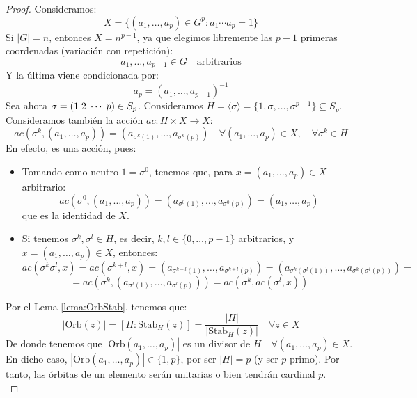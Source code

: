 \documentclass[12pt]{article}
\newcommand{\Stab}{\text{Stab}}
\newcommand{\Orb}{\text{Orb}}
\begin{document}
\begin{ejercicio}[2 puntos]
        \begin{proof}
            Consideramos:
            $$X = \{(a_1, \ldots, a_p) \in G^{p} : a_1 \cdots a_p = 1\}$$
            Si $|G| = n$, entonces $X = n^{p-1}$, ya que elegimos libremente las $p-1$ primeras coordenadas (variación con repetición):
            $$a_1, \ldots, a_{p-1} \in G \quad \text{arbitrarios}$$
            Y la última viene condicionada por:
            $$a_p = (a_1, \ldots, a_{p-1})^{-1}$$
            Sea ahora $\sigma = (1 \hspace{0.1cm} 2 \hspace{0.1cm} \cdots \hspace{0.1cm} p) \in S_p$. Consideramos $H = \langle \sigma \rangle = \{1, \sigma, \ldots, \sigma^{p-1}\} \subseteq S_p$. Consideramos también la acción $ac : H \times X \to X$:
            $$ac(\sigma^{k}, (a_1, \ldots, a_p)) = (a_{\sigma^{k}(1)}, \ldots, a_{\sigma^{k}(p)}) \quad \forall(a_1,\ldots,a_p) \in X, \quad \forall \sigma^{k} \in H$$
            En efecto, es una acción, pues:
            \begin{itemize}
                \item Tomando como neutro $1 = \sigma^{0}$, tenemos que, para $x = (a_1, \ldots, a_p) \in X$ arbitrario: $$ac(\sigma^{0}, (a_1, \ldots, a_p)) = (a_{\sigma^{0}(1)}, \ldots, a_{\sigma^{0}(p)}) = (a_1, \ldots, a_p)$$ que es la identidad de $X$.
                \item Si tenemos $\sigma^{k}, \sigma^{l} \in H$, es decir, $k,l \in \{0, \ldots, p-1\}$ arbitrarios, y $x=(a_1, \ldots, a_p) \in X$, entonces:
                $$ac(\sigma^{k} \sigma^{l}, x) = ac(\sigma^{k+l}, x) = (a_{\sigma^{k+l}(1)}, \ldots, a_{\sigma^{k+l}(p)}) = (a_{\sigma^{k}(\sigma^{l}(1))}, \ldots, a_{\sigma^{k}(\sigma^{l}(p))}) = $$
                $$= ac(\sigma^{k}, (a_{\sigma^{l}(1)}, \ldots, a_{\sigma^{l}(p)})) = ac(\sigma^{k}, ac(\sigma^{l}, x))$$
            \end{itemize}
            Por el Lema \ref{lema:OrbStab}, tenemos que:
            $$|\Orb(z)| = [H : \Stab_H(z)] = \dfrac{|H|}{|\Stab_H(z)|} \quad \forall z \in X$$
            De donde tenemos que $|\Orb(a_1, \ldots, a_p)|$ es un divisor de $H \quad \forall (a_1, \ldots, a_p) \in X$. En dicho caso, $|\Orb(a_1, \ldots, a_p)| \in \{1,p\}$, por ser $|H| = p$ (y ser $p$ primo). Por tanto, las órbitas de un elemento serán unitarias o bien tendrán cardinal $p$. \\


\end{proof}
\end{ejercicio}
\end{document}
